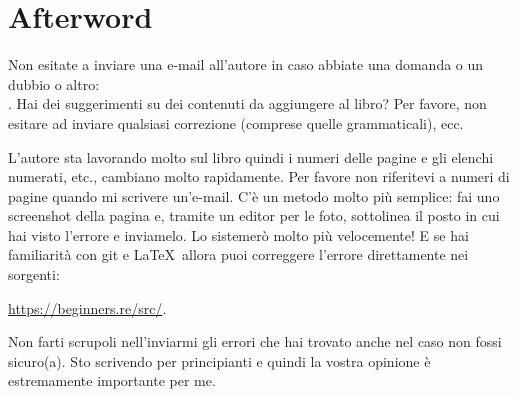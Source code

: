 \part*{Afterword}


Non esitate a inviare una e-mail all'autore in caso abbiate una domanda o un dubbio o altro: \\
\GTT{\EMAILS}.
Hai dei suggerimenti su dei contenuti da aggiungere al libro?
Per favore, non esitare ad inviare qualsiasi correzione (comprese quelle grammaticali), ecc.

L'autore sta lavorando molto sul libro quindi i numeri delle pagine e gli elenchi numerati, etc., cambiano molto rapidamente.
Per favore non riferitevi a numeri di pagine quando mi scrivere un'e-mail.
C'è un metodo molto più semplice: fai uno screenshot della pagina e, tramite un editor per le foto, sottolinea il posto in cui hai visto l'errore
e inviamelo. Lo sistemerò molto più velocemente!
E se hai familiarità con git e \LaTeX\, allora puoi correggere l'errore direttamente nei sorgenti:

\url{https://beginners.re/src/}.

Non farti scrupoli nell'inviarmi gli errori che hai trovato anche nel caso non fossi sicuro(a).
Sto scrivendo per principianti e quindi la vostra opinione è estremamente importante per me.
